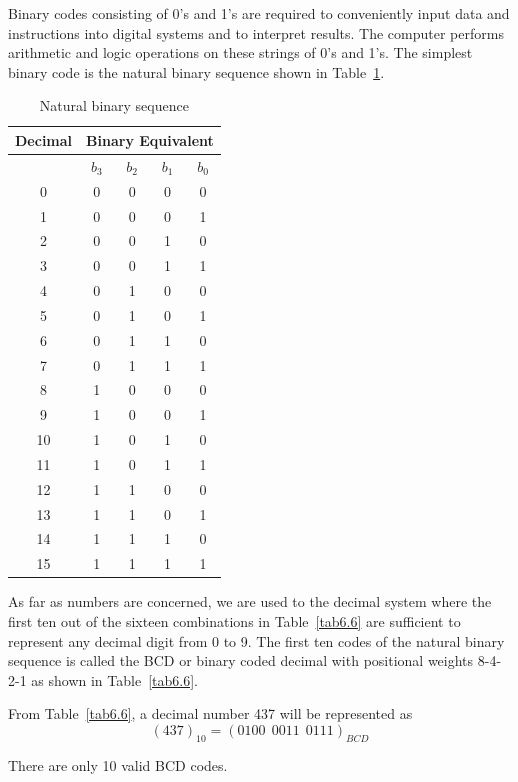 Binary codes consisting of 0's and 1's are required to conveniently input data and instructions into digital systems and to interpret results. The computer performs arithmetic and logic operations on these strings of 0's and 1's. The simplest binary code is the natural binary sequence shown in Table~\ref{tab6.5}.
\begin{table}[H]
\centering
\caption{Natural binary sequence}\label{tab6.5}
\tabcolsep=12pt
\renewcommand{\arraystretch}{1.25}
\begin{tabular}{|c|cccc|}
\hline
{\bf Decimal} & \multicolumn{4}{c|}{\bf Binary Equivalent}\\
\hline
 & $b_{3}$ & $b_{2}$ & $b_{1}$ & $b_{0}$\\
\hline
0 & 0 & 0 & 0 & 0\\
1 & 0 & 0 & 0 & 1\\
2 & 0 & 0 & 1 & 0\\
3 & 0 & 0 & 1 & 1\\
4 & 0 & 1 & 0 & 0\\
5 & 0 & 1 & 0 & 1\\
6 & 0 & 1 & 1 & 0\\
7 & 0 & 1 & 1 & 1\\
8 & 1 & 0 & 0 & 0\\
9 & 1 & 0 & 0 & 1\\
10 & 1 & 0 & 1 & 0\\
11 & 1 & 0 & 1 & 1\\
12 & 1 & 1 & 0 & 0\\
13 & 1 & 1 & 0 & 1\\
14 & 1 & 1 & 1 & 0\\
15 & 1 & 1 & 1 & 1\\
\hline
\end{tabular}
\end{table}

As far as numbers are concerned, we are used to the decimal system where the first ten out of the sixteen combinations in Table~\ref{tab6.6} are sufficient to represent any decimal digit from 0 to 9. The first ten codes of the natural binary sequence is called the BCD or binary coded decimal with positional weights 8-4-2-1 as shown in Table~\ref{tab6.6}.

\eject

From Table~\ref{tab6.6}, a decimal number 437 will be represented as 
$$
(437)_{10}=(0100 \ \ 0011 \ \ 0111)_{BCD}
$$

There are only 10 valid BCD codes.

